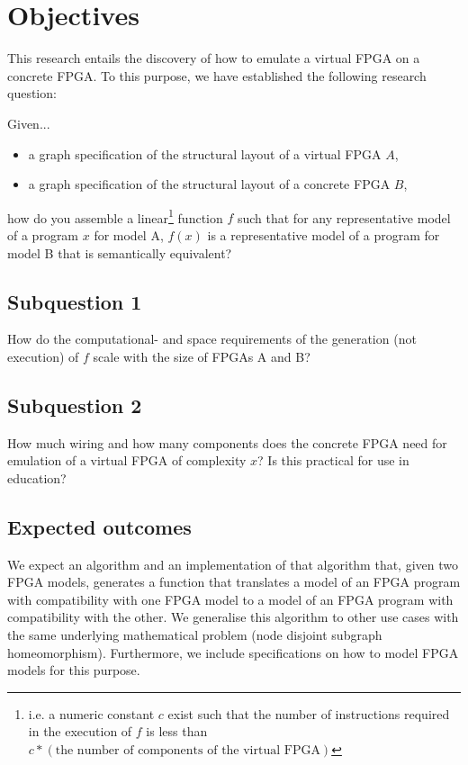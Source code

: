 \chapter{Objectives}
\label{sec:Objectives}
This research entails the discovery of how to emulate a virtual FPGA on a concrete FPGA. To this purpose, we have established the following research question:

Given...
\begin{itemize}
    \item a graph specification of the structural layout of a virtual FPGA $A$,
    \item a graph specification of the structural layout of a concrete FPGA $B$,
\end{itemize}{}
how do you assemble a linear\footnote{i.e. a numeric constant $c$ exist such that the number of instructions required in the execution of $f$ is less than $c * (\text{the number of components of the virtual FPGA})$} function $f$ such that for any representative model of a program $x$ for model A, $f(x)$ is a representative model of a program for model B that is semantically equivalent?
\section*{Subquestion 1}
How do the computational- and space requirements of the generation (not execution) of $f$ scale with the size of FPGAs A and B?
\section*{Subquestion 2}
How much wiring and how many components does the concrete FPGA need for emulation of a virtual FPGA of complexity $x$? Is this practical for use in education?
\section*{Expected outcomes}
We expect an algorithm and an implementation of that algorithm that, given two FPGA models, generates a function that translates a model of an FPGA program with compatibility with one FPGA model to a model of an FPGA program with compatibility with the other. We generalise this algorithm to other use cases with the same underlying mathematical problem (node disjoint subgraph homeomorphism). Furthermore, we include specifications on how to model FPGA models for this purpose. 